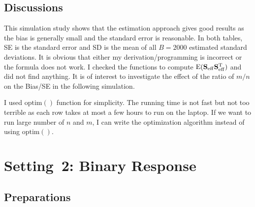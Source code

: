 \documentclass[12pt]{article}
\def\S{{\bf S}}
\def\bb{{\boldsymbol\beta}}
\def\trans{^{\rm T}}
\def\eff{_{\rm eff}}
\def\boxit#1{\vbox{\hrule\hbox{\vrule\kern6pt\vbox{\kern6pt#1\kern6pt}\kern6pt\vrule}\hrule}}
\def\qt#1{\vskip 2mm\boxit{\vskip 2mm{\color{red}\bf#1} {\color{red}\bf -- Qinglong\vskip 2mm}}\vskip 2mm}
\begin{document}
\subsection*{Discussions}
This simulation study shows that the estimation approach gives good results as the bias is generally small and the standard error is reasonable.
In both tables, SE is the standard error and SD is the mean of all $B=2000$ estimated standard deviations.
It is obvious that either my derivation/programming is incorrect or the formula does not work.
I checked the functions to compute $\mathrm{E}(\S\eff\S\eff\trans)$ and did not find anything.
It is of interest to investigate the effect of the ratio of $m/n$ on the Bias/SE in the following simulation.

I used $\mathrm{optim}()$ function for simplicity.
The running time is not fast but not too terrible as each row takes at most a few hours to run on the laptop.
If we want to run large number of $n$ and $m$, I can write the optimization algorithm instead of using $\mathrm{optim}()$.

\section*{Setting~2: Binary Response}

%

\subsection*{Preparations}
\end{document}
